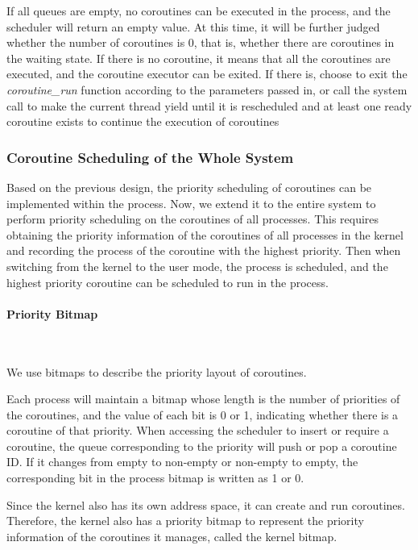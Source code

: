 \documentclass[10pt]{article}
\begin{document}
If all queues are empty, no coroutines can be executed in the process, and the scheduler will return an empty value. At this time, it will be further judged whether the number of coroutines is 0, that is, whether there are coroutines in the waiting state. If there is no coroutine, it means that all the coroutines are executed, and the coroutine executor can be exited. If there is, choose to exit the \textit{coroutine\_run} function according to the parameters passed in, or call the system call to make the current thread yield until it is rescheduled and at least one ready coroutine exists to continue the execution of coroutines



\subsubsection{Coroutine Scheduling of the Whole System}

Based on the previous design, the priority scheduling of coroutines can be implemented within the process. Now, we extend it to the entire system to perform priority scheduling on the coroutines of all processes. This requires obtaining the priority information of the coroutines of all processes in the kernel and recording the process of the coroutine with the highest priority. Then when switching from the kernel to the user mode, the process is scheduled, and the highest priority coroutine can be scheduled to run in the process.


\paragraph{Priority Bitmap}~{}

We use bitmaps to describe the priority layout of coroutines.

Each process will maintain a bitmap whose length is the number of priorities of the coroutines, and the value of each bit is 0 or 1, indicating whether there is a coroutine of that priority. When accessing the scheduler to insert or require a coroutine, the queue corresponding to the priority will push or pop a coroutine ID. If it changes from empty to non-empty or non-empty to empty, the corresponding bit in the process bitmap is written as 1 or 0.

Since the kernel also has its own address space, it can create and run coroutines. Therefore, the kernel also has a priority bitmap to represent the priority information of the coroutines it manages, called the kernel bitmap.
\end{document}
